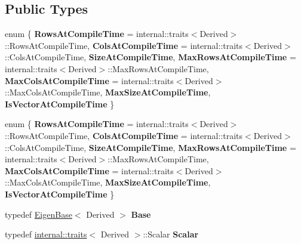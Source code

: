 \subsection*{Public Types}
\begin{DoxyCompactItemize}
\item 
\mbox{\label{class_eigen_1_1_solver_base_a2ce79b3c145f567992f17129e385d76c}} 
enum \{ \newline
{\bfseries Rows\+At\+Compile\+Time} = internal\+:\+:traits$<$Derived$>$\+:\+:Rows\+At\+Compile\+Time, 
{\bfseries Cols\+At\+Compile\+Time} = internal\+:\+:traits$<$Derived$>$\+:\+:Cols\+At\+Compile\+Time, 
{\bfseries Size\+At\+Compile\+Time}, 
{\bfseries Max\+Rows\+At\+Compile\+Time} = internal\+:\+:traits$<$Derived$>$\+:\+:Max\+Rows\+At\+Compile\+Time, 
\newline
{\bfseries Max\+Cols\+At\+Compile\+Time} = internal\+:\+:traits$<$Derived$>$\+:\+:Max\+Cols\+At\+Compile\+Time, 
{\bfseries Max\+Size\+At\+Compile\+Time}, 
{\bfseries Is\+Vector\+At\+Compile\+Time}
 \}
\item 
\mbox{\label{class_eigen_1_1_solver_base_a23db20922e8e15e0214760d3e95b98fa}} 
enum \{ \newline
{\bfseries Rows\+At\+Compile\+Time} = internal\+:\+:traits$<$Derived$>$\+:\+:Rows\+At\+Compile\+Time, 
{\bfseries Cols\+At\+Compile\+Time} = internal\+:\+:traits$<$Derived$>$\+:\+:Cols\+At\+Compile\+Time, 
{\bfseries Size\+At\+Compile\+Time}, 
{\bfseries Max\+Rows\+At\+Compile\+Time} = internal\+:\+:traits$<$Derived$>$\+:\+:Max\+Rows\+At\+Compile\+Time, 
\newline
{\bfseries Max\+Cols\+At\+Compile\+Time} = internal\+:\+:traits$<$Derived$>$\+:\+:Max\+Cols\+At\+Compile\+Time, 
{\bfseries Max\+Size\+At\+Compile\+Time}, 
{\bfseries Is\+Vector\+At\+Compile\+Time}
 \}
\item 
\mbox{\label{class_eigen_1_1_solver_base_a12798f4bbad57ef378b087801ab90cfe}} 
typedef \hyperlink{group___core___module_struct_eigen_1_1_eigen_base}{Eigen\+Base}$<$ Derived $>$ {\bfseries Base}
\item 
\mbox{\label{class_eigen_1_1_solver_base_a08184e3c085cce33f80b5a37376d52ab}} 
typedef \hyperlink{struct_eigen_1_1internal_1_1traits}{internal\+::traits}$<$ Derived $>$\+::Scalar {\bfseries Scalar}

\end{DoxyCompactItemize}

